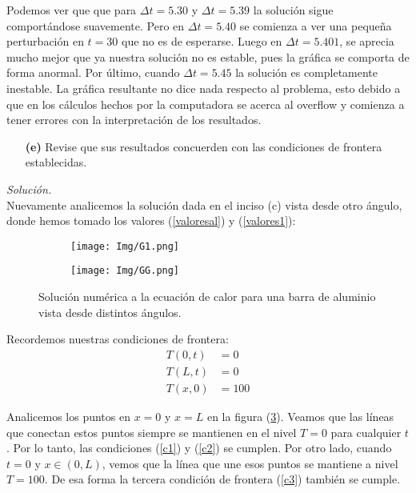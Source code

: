 \documentclass[11pt]{article}
\begin{document}
	Podemos ver que que para $\Delta t = 5.30$ y $\Delta t =5.39$ la solución sigue comportándose suavemente. Pero en $\Delta t = 5.40$ se comienza a ver una pequeña perturbación en $t=30$ que no es de esperarse. Luego en $\Delta t = 5.401$, se aprecia mucho mejor que ya nuestra solución no es estable, pues la gráfica se comporta de forma anormal. Por último, cuando $\Delta t = 5.45$ la solución es completamente inestable. La gráfica resultante no dice nada respecto al problema, esto debido a que en los cálculos hechos por la computadora se acerca al overflow y comienza a tener errores con la interpretación de los resultados. 
	
	
\begin{enumerate}
	\item [\textbf{(e)}]  Revise que sus resultados concuerden con las condiciones de frontera establecidas.
\end{enumerate}
\textit{Solución.}\\	
	Nuevamente analicemos la solución dada en el inciso (c) vista desde otro ángulo, donde hemos tomado los valores (\ref{valoresal}) y (\ref{valores1}):
	\begin{figure}[htp!]
		\begin{subfigure}[b]{0.48\textwidth}
			\centering
			\texttt{[image: Img/G1.png]}
			\label{}
		\end{subfigure}
		\hfill
		\begin{subfigure}[b]{0.48\textwidth}
			\centering
			\texttt{[image: Img/GG.png]}
			\label{}
		\end{subfigure}
		\caption{Solución numérica a la ecuación de calor para una barra de aluminio vista desde distintos ángulos.}
		\label{e}
	\end{figure}

	Recordemos nuestras condiciones de frontera:
	\begin{align}
		T(0,t) &=  0  \label{c1}\\
		T(L,t)  &= 	0  \label{c2}\\
		T(x,0) &= 100 \label{c3}
	\end{align}
	
	Analicemos los puntos en $x=0$ y $x=L$ en la figura (\ref{e}). Veamos que las líneas que conectan estos puntos siempre se mantienen en el nivel $T=0$ para cualquier $t$. Por lo tanto, las condiciones (\ref{c1}) y (\ref{c2}) se cumplen. Por otro lado, cuando $t=0$ y $x\in (0,L)$, vemos que la línea que une esos puntos se mantiene a nivel $T=100$. De esa forma la tercera condición de frontera (\ref{c3}) también se cumple.
\end{document}
